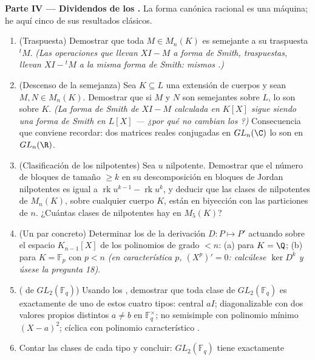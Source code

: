 \begin{problem}
\medskip
\noindent\textbf{Parte IV --- Dividendos de los
.} La forma
canónica racional es una máquina; he aquí cinco de sus resultados
clásicos.
\begin{enumerate}[resume]
  \item (Traspuesta) Demostrar que toda $M \in M_n(K)$ es semejante a su
  traspuesta ${}^tM$. \emph{(Las operaciones que llevan $XI - M$ a forma
  de Smith, traspuestas, llevan $XI - {}^tM$ a la misma forma de Smith:
  mismos .)}
  \item (Descenso de la semejanza) Sea $K \subseteq L$ una extensión de
  cuerpos y sean $M, N \in M_n(K)$. Demostrar que si $M$ y $N$ son
  semejantes sobre $L$, lo son sobre $K$. \emph{(La forma de Smith de
  $XI - M$ calculada en $K[X]$ sigue siendo una forma de Smith en $L[X]$
  --- ¿por qué no cambian los ?)} Consecuencia que conviene recordar: dos matrices
  reales conjugadas en $GL_n(\C)$ lo son en
        $GL_n(\R)$.
  \item (Clasificación de los nilpotentes) Sea $u$ nilpotente. Demostrar
  que el número de bloques de tamaño $\geq k$ en su descomposición en
  bloques de Jordan nilpotentes es igual a
  $\operatorname{rk}u^{k-1} - \operatorname{rk}u^k$, y deducir que las
  clases de nilpotentes de $M_n(K)$, sobre cualquier cuerpo $K$, están
  en biyección con las particiones de $n$. ¿Cuántas clases de
  nilpotentes hay en $M_5(K)$? \item (Un par concreto) Determinar los
   de la
  derivación $D\colon P \mapsto P'$ actuando sobre el espacio
  $K_{n-1}[X]$ de los polinomios de grado $< n$: (a) para $K =
        \Q$; (b) para $K = \mathbb F_p$ con $p < n$ \emph{(en
  característica $p$, $(X^p)' = 0$: calcúlese $\ker D^k$ y úsese la
  pregunta 18)}. \item ( de $GL_2(\mathbb F_q)$) Usando los
  , demostrar que
  toda clase de $GL_2(\mathbb F_q)$ es exactamente de uno de estos
  cuatro tipos: central $aI$; diagonalizable con dos valores propios
  distintos $a \neq b$ en $\mathbb F_q^\times$; no semisimple con
  polinomio mínimo $(X - a)^2$; cíclica con polinomio característico
  . \item Contar las
  clases de cada tipo y concluir: $GL_2(\mathbb F_q)$ tiene exactamente

\end{enumerate}
\end{problem}
